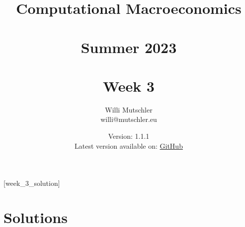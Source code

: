 
\newif\ifDisplaySolutions\DisplaySolutionstrue


\title{Computational Macroeconomics\\~\\Summer 2023\\~\\Week 3}
\author{Willi Mutschler\\willi@mutschler.eu}
\date{Version: 1.1.1\\Latest version available on: \href{https://github.com/wmutschl/Computational-Macroeconomics/releases/latest/download/week_3.pdf}{GitHub}}
\maketitle\thispagestyle{empty}

\newpage
{}[week_3_solution]
\tableofcontents\thispagestyle{empty}\newpage

\setcounter{page}{1}
\newpage
\newpage
\newpage
\newpage
\printbibliography
\newpage

\ifDisplaySolutions
\newpage
\appendix
\section{Solutions}

\fi
